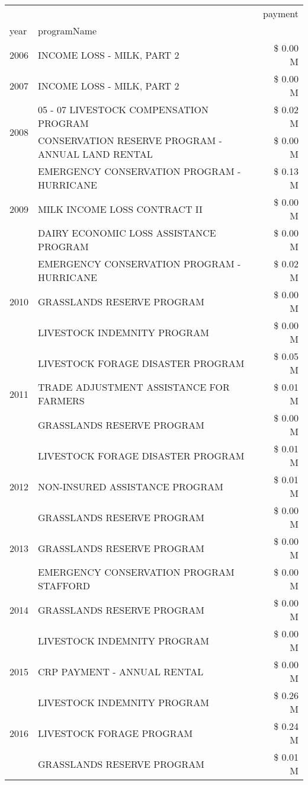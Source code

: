 \begin{tabular}{llr}
\toprule
 &  & payment \\
year & programName &  \\
\midrule
2006 & INCOME LOSS - MILK, PART 2 & \$ 0.00 M \\
\cline{1-3}
2007 & INCOME LOSS - MILK, PART 2 & \$ 0.00 M \\
\cline{1-3}
\multirow[t]{2}{*}{2008} & 05 - 07 LIVESTOCK COMPENSATION PROGRAM & \$ 0.02 M \\
 & CONSERVATION RESERVE PROGRAM - ANNUAL LAND RENTAL & \$ 0.00 M \\
\cline{1-3}
\multirow[t]{3}{*}{2009} & EMERGENCY CONSERVATION PROGRAM - HURRICANE & \$ 0.13 M \\
 & MILK INCOME LOSS CONTRACT II & \$ 0.00 M \\
 & DAIRY ECONOMIC LOSS ASSISTANCE PROGRAM & \$ 0.00 M \\
\cline{1-3}
\multirow[t]{3}{*}{2010} & EMERGENCY CONSERVATION PROGRAM - HURRICANE & \$ 0.02 M \\
 & GRASSLANDS RESERVE PROGRAM & \$ 0.00 M \\
 & LIVESTOCK INDEMNITY PROGRAM & \$ 0.00 M \\
\cline{1-3}
\multirow[t]{3}{*}{2011} & LIVESTOCK FORAGE DISASTER PROGRAM & \$ 0.05 M \\
 & TRADE ADJUSTMENT ASSISTANCE FOR FARMERS & \$ 0.01 M \\
 & GRASSLANDS RESERVE PROGRAM & \$ 0.00 M \\
\cline{1-3}
\multirow[t]{3}{*}{2012} & LIVESTOCK FORAGE DISASTER PROGRAM & \$ 0.01 M \\
 & NON-INSURED ASSISTANCE PROGRAM & \$ 0.01 M \\
 & GRASSLANDS RESERVE PROGRAM & \$ 0.00 M \\
\cline{1-3}
2013 & GRASSLANDS RESERVE PROGRAM & \$ 0.00 M \\
\cline{1-3}
\multirow[t]{3}{*}{2014} & EMERGENCY CONSERVATION PROGRAM STAFFORD & \$ 0.00 M \\
 & GRASSLANDS RESERVE PROGRAM & \$ 0.00 M \\
 & LIVESTOCK INDEMNITY PROGRAM & \$ 0.00 M \\
\cline{1-3}
2015 & CRP PAYMENT - ANNUAL RENTAL & \$ 0.00 M \\
\cline{1-3}
\multirow[t]{3}{*}{2016} & LIVESTOCK INDEMNITY PROGRAM & \$ 0.26 M \\
 & LIVESTOCK FORAGE PROGRAM & \$ 0.24 M \\
 & GRASSLANDS RESERVE PROGRAM & \$ 0.01 M \\

\end{tabular}
